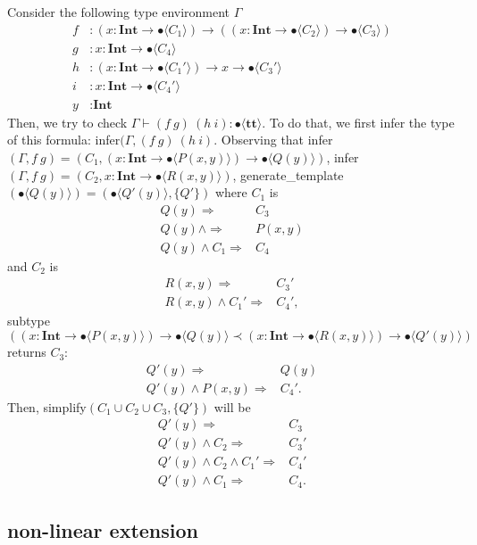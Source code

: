 \documentclass[runningheads]{llncs}
\newcommand \true {\textbf{tt}}
\newcommand \stypeint {\textbf{Int}}
\newcommand \stypebool {\bullet}
\newcommand \typeint[1]{{#1} : \stypeint}
\newcommand \typebool[1]{\stypebool \langle #1 \rangle}
\begin{document}
Consider the following type environment \(\Gamma\)
\begin{align*}
    f&: (\typeint{x} \to \typebool{C_1}) \to ((\typeint{x} \to \typebool{C_2})
    \to \typebool{C_3})\\
    g&: \typeint{x} \to \typebool{C_4}\\
    h&: (\typeint{x} \to \typebool{C_1'}) \to x \to \typebool{C_3'}\\
    i&: \typeint{x} \to \typebool{C_4'}\\
    y&: \stypeint
\end{align*}
Then, we try to check \(\Gamma \vdash (f\ g)\ (h\ i): \typebool{\true}\).
To do that, we first infer the type of this formula: infer\((\Gamma, (f\ g)\
(h\ i)\).
Observing that infer\((\Gamma, f\ g) = (C_1, (\typeint{x} \rightarrow
\typebool{P(x, y)}) \rightarrow \typebool{Q(y)} )\), infer\((\Gamma, f\ g)
= (C_2, \typeint{x} \rightarrow \typebool{R(x, y)})\),
generate\_template\((\typebool{Q(y)}) = (\typebool{Q'(y)}, \{Q'\})\)
where \(C_1\) is
\begin{align*}
    Q(y) \Rightarrow &C_3\\
    Q(y) \land \Rightarrow &P(x, y)\\
    Q(y) \land C_1  \Rightarrow &C_4
\end{align*}
and \(C_2\) is
\begin{align*}
    R(x, y) \Rightarrow &C_3'\\
    R(x, y) \land C_1'\Rightarrow &C_4',
\end{align*}
subtype\(( (\typeint{x} \to \typebool{P(x, y)}) \to \typebool{Q(y)} \prec
(\typeint{x} \to \typebool{R(x, y)}) \to \typebool{Q'(y)}) \) returns \(C_3\):
\begin{align*}
    Q'(y) \Rightarrow &Q(y)\\
    Q'(y) \land P(x, y) \Rightarrow &C_4'.
\end{align*}
Then, simplify\((C_1 \cup C_2 \cup C_3, \{Q'\})\) will be
\begin{align*}
    Q'(y) \Rightarrow &C_3\\
    Q'(y) \land C_2 \Rightarrow &C_3'\\
    Q'(y) \land C_2 \land C_1' \Rightarrow &C_4'\\
    Q'(y) \land C_1 \Rightarrow &C_4.
\end{align*}



\subsection{non-linear extension}
\end{document}

